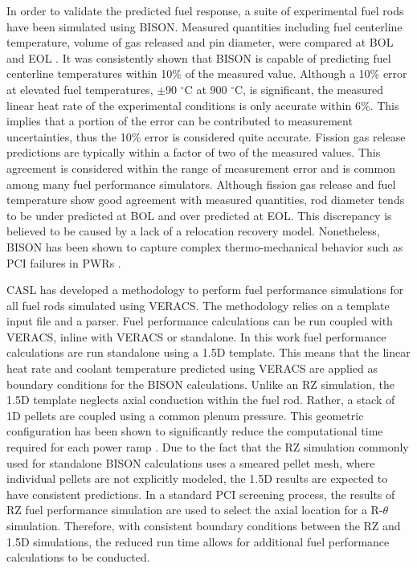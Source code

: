 \documentclass[edeposit,fullpage,11pt]{uiucthesis2009}
\begin{document}
In order to validate the predicted fuel response, a suite of experimental fuel rods have been simulated using BISON.
Measured quantities including fuel centerline temperature, volume of gas released and pin diameter, were compared at \gls{BOL} and \gls{EOL} \cite{williamson_validating_2016}.
It was consistently shown that BISON is capable of predicting fuel centerline temperatures within 10\% of the measured value.
Although a 10\% error at elevated fuel temperatures, $\pm$90 $^\circ$C at 900 $^\circ$C, is significant, the measured linear heat rate of the experimental conditions is only accurate within 6\%. 
This implies that a portion of the error can be contributed to measurement uncertainties, thus the 10\% error is considered quite accurate.
Fission gas release predictions are typically within a factor of two of the measured values.
This agreement is considered within the range of measurement error and is common among many fuel performance simulators.
Although fission gas release and fuel temperature show good agreement with measured quantities, rod diameter tends to be under predicted at \gls{BOL} and over predicted at \gls{EOL}.
This discrepancy is believed to be caused by a lack of a relocation recovery model.
Nonetheless, BISON has been shown to capture complex thermo-mechanical behavior such as PCI failures in PWRs \cite{montgomery_advanced_2014,capps_pci_2017}.

\gls{CASL} has developed a methodology to perform fuel performance simulations for all fuel rods simulated using \gls{VERACS}.
The methodology relies on a template input file and a parser.
Fuel performance calculations can be run coupled with \gls{VERACS}, inline with \gls{VERACS} or standalone.
In this work fuel performance calculations are run standalone using a 1.5D template.
This means that the linear heat rate and coolant temperature predicted using \gls{VERACS} are applied as boundary conditions for the BISON calculations.
Unlike an RZ simulation, the 1.5D template neglects axial conduction within the fuel rod.
Rather, a stack of 1D pellets are coupled using a common plenum pressure.  
This geometric configuration has been shown to significantly reduce the computational time required for each power ramp \cite{gardner_review_2017}.
Due to the fact that the RZ simulation commonly used for standalone BISON calculations uses a smeared pellet mesh, where individual pellets are not explicitly modeled, the 1.5D results are expected to have consistent predictions.
In a standard \gls{PCI} screening process, the results of RZ fuel performance simulation are used to select the axial location for a R-$\theta$ simulation.
Therefore, with consistent boundary conditions between the RZ and 1.5D simulations, the reduced run time allows for additional fuel performance calculations to be conducted.
\end{document}
